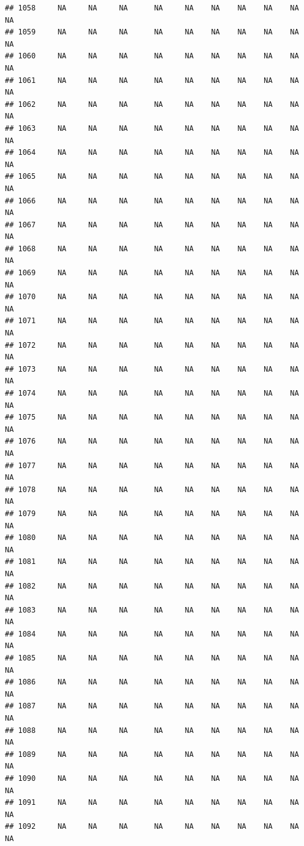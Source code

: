 \documentclass{article}\usepackage{graphicx, color}
\makeatletter
\newenvironment{kframe}{%
 \def\at@end@of@kframe{}%
 \ifinner\ifhmode%
  \def\at@end@of@kframe{\end{minipage}}%
  \begin{minipage}{\columnwidth}%
 \fi\fi%
 \def\FrameCommand##1{\hskip\@totalleftmargin \hskip-\fboxsep
 \colorbox{shadecolor}{##1}\hskip-\fboxsep
     \hskip-\linewidth \hskip-\@totalleftmargin \hskip\columnwidth}%
 \MakeFramed {\advance\hsize-\width
   \@totalleftmargin\z@ \linewidth\hsize
   \@setminipage}}%
 {\par\unskip\endMakeFramed%
 \at@end@of@kframe}
\newenvironment{knitrout}{}{} %
\makeatother
\begin{document}
\begin{knitrout}
\begin{kframe}
\begin{verbatim}
## 1058     NA     NA     NA      NA     NA    NA    NA    NA    NA     NA
## 1059     NA     NA     NA      NA     NA    NA    NA    NA    NA     NA
## 1060     NA     NA     NA      NA     NA    NA    NA    NA    NA     NA
## 1061     NA     NA     NA      NA     NA    NA    NA    NA    NA     NA
## 1062     NA     NA     NA      NA     NA    NA    NA    NA    NA     NA
## 1063     NA     NA     NA      NA     NA    NA    NA    NA    NA     NA
## 1064     NA     NA     NA      NA     NA    NA    NA    NA    NA     NA
## 1065     NA     NA     NA      NA     NA    NA    NA    NA    NA     NA
## 1066     NA     NA     NA      NA     NA    NA    NA    NA    NA     NA
## 1067     NA     NA     NA      NA     NA    NA    NA    NA    NA     NA
## 1068     NA     NA     NA      NA     NA    NA    NA    NA    NA     NA
## 1069     NA     NA     NA      NA     NA    NA    NA    NA    NA     NA
## 1070     NA     NA     NA      NA     NA    NA    NA    NA    NA     NA
## 1071     NA     NA     NA      NA     NA    NA    NA    NA    NA     NA
## 1072     NA     NA     NA      NA     NA    NA    NA    NA    NA     NA
## 1073     NA     NA     NA      NA     NA    NA    NA    NA    NA     NA
## 1074     NA     NA     NA      NA     NA    NA    NA    NA    NA     NA
## 1075     NA     NA     NA      NA     NA    NA    NA    NA    NA     NA
## 1076     NA     NA     NA      NA     NA    NA    NA    NA    NA     NA
## 1077     NA     NA     NA      NA     NA    NA    NA    NA    NA     NA
## 1078     NA     NA     NA      NA     NA    NA    NA    NA    NA     NA
## 1079     NA     NA     NA      NA     NA    NA    NA    NA    NA     NA
## 1080     NA     NA     NA      NA     NA    NA    NA    NA    NA     NA
## 1081     NA     NA     NA      NA     NA    NA    NA    NA    NA     NA
## 1082     NA     NA     NA      NA     NA    NA    NA    NA    NA     NA
## 1083     NA     NA     NA      NA     NA    NA    NA    NA    NA     NA
## 1084     NA     NA     NA      NA     NA    NA    NA    NA    NA     NA
## 1085     NA     NA     NA      NA     NA    NA    NA    NA    NA     NA
## 1086     NA     NA     NA      NA     NA    NA    NA    NA    NA     NA
## 1087     NA     NA     NA      NA     NA    NA    NA    NA    NA     NA
## 1088     NA     NA     NA      NA     NA    NA    NA    NA    NA     NA
## 1089     NA     NA     NA      NA     NA    NA    NA    NA    NA     NA
## 1090     NA     NA     NA      NA     NA    NA    NA    NA    NA     NA
## 1091     NA     NA     NA      NA     NA    NA    NA    NA    NA     NA
## 1092     NA     NA     NA      NA     NA    NA    NA    NA    NA     NA

\end{verbatim}
\end{kframe}
\end{knitrout}
\end{document}
